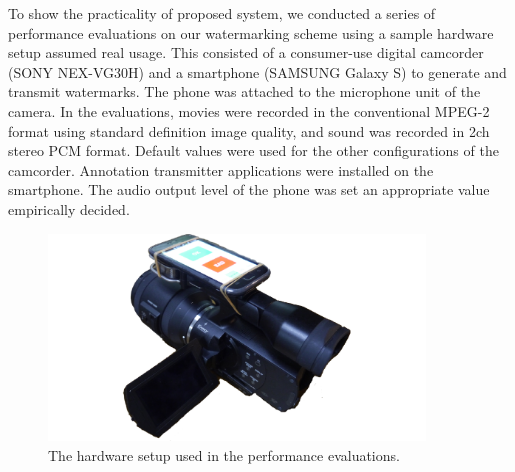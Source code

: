 To show the practicality of proposed system, we conducted a series of performance evaluations on our watermarking scheme using a sample hardware setup assumed real usage.
This consisted of a consumer-use digital camcorder (SONY NEX-VG30H) and a smartphone (SAMSUNG Galaxy S) to generate and transmit watermarks.
The phone was attached to the microphone unit of the camera.
In the evaluations, movies were recorded in the conventional MPEG-2 format using standard definition image quality, and sound was recorded in 2ch stereo PCM format.
Default values were used for the other configurations of the camcorder.
Annotation transmitter applications were installed on the smartphone.
The audio output level of the phone was set an appropriate value empirically decided.

\begin{figure}[htbp]
 \begin{center}
  \vspace{5mm}
  \includegraphics[width=100mm]{evaluation_environment.pdf}
 \end{center}
 \caption{The hardware setup used in the performance evaluations.}
 \label{fig:eval_hard}
\end{figure}
